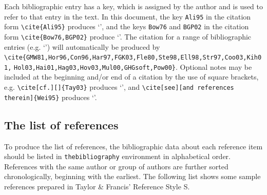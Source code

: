 \documentclass[]{interact}
\theoremstyle{plain}%
\theoremstyle{definition}
\theoremstyle{remark}
\begin{document}
Each bibliographic entry has a key, which is assigned by the author and is used to refer to that entry in the text. In this document, the key \verb"Ali95" in the citation form \verb"\cite{Ali95}" produces `\cite{Ali95}', and the keys \verb"Bow76" and \verb"BGP02" in the citation form \verb"\cite{Bow76,BGP02}" produce `\cite{Bow76,BGP02}'. The citation for a range of bibliographic entries (e.g. `\cite{GMW81,Hor96,Con96,Har97,FGK03,Fle80,Ste98,Ell98,Str97,Coo03,Kih01,Hol03,Hai01,Hag03,Hov03,Mul00,GHGsoft,Pow00}') will automatically be produced by \verb"\cite{GMW81,Hor96,Con96,Har97,FGK03,Fle80,Ste98,Ell98,Str97,Coo03,Kih01," \verb"Hol03,Hai01,Hag03,Hov03,Mul00,GHGsoft,Pow00}".
Optional notes may be included at the beginning and/or end of a citation by the use of square brackets, e.g. \verb"\cite[cf.][]{Tay03}" produces `\cite[cf.][]{Tay03}', and \verb"\cite[see][and references therein]{Wei95}" produces `\cite[see][and references therein]{Wei95}'.

\subsection{The list of references}

To produce the list of references, the bibliographic data about each reference item should be listed in \texttt{thebibliography} environment in alphabetical order. References with the same author or group of authors are further sorted chronologically, beginning with the earliest. The following list shows some sample references prepared in Taylor \& Francis' Reference Style S.
\end{document}
